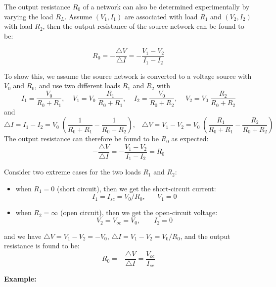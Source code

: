 \begin{itemize}

The output resistance $R_0$ of a network can also be determined 
experimentally by varying the load $R_L$. Assume $(V_1, I_1)$ are 
associated with load $R_1$ and $(V_2, I_2)$ with load $R_2$, then 
the output resistance of the source network can be found to be:

\[ R_0=-\frac{\triangle V}{\triangle I}=-\frac{V_1-V_2}{I_1-I_2} \]

To show this, we assume the source network is converted to a voltage
source with $V_0$ and $R_0$, and use two different loads $R_1$ and
$R_2$ with
\[ I_1=\frac{V_0}{R_0+R_1},\;\;\;\;V_1=V_0\;\frac{R_1}{R_0+R_1},\;\;\;\;
   I_2=\frac{V_0}{R_0+R_2},\;\;\;\;V_2=V_0\;\frac{R_2}{R_0+R_2} \]
and
\[ \triangle I=I_1-I_2=V_0\;(\frac{1}{R_0+R_1}-\frac{1}{R_0+R_2}),\;\;\;
   \triangle V=V_1-V_2=V_0\;(\frac{R_1}{R_0+R_1}-\frac{R_2}{R_0+R_2}) \]
The output resistance can therefore be found to be $R_0$ as expected:
\[ -\frac{\triangle V}{\triangle I}=-\frac{V_1-V_2}{I_1-I_2}=R_0 \]

Consider two extreme cases for the two loads $R_1$ and $R_2$:
\begin{itemize}
\item when $R_1=0$ (short circuit), then we get the short-circuit 
  current: 
  \[ I_1=I_{sc}=V_0/R_0,\;\;\;\;\;\; V_1=0 \]
\item when $R_2=\infty$ (open circuit), then we get the open-circuit
  voltage: 
  \[ V_2=V_{oc}=V_0,\;\;\;\;\;\;\;I_2=0 \]
\end{itemize}
and we have $\triangle V=V_1-V_2=-V_0$, $\triangle I=V_1-V_2=V_0/R_0$,
and the output resistance is found to be:
\[ R_0=-\frac{\triangle V}{\triangle I}=\frac{V_{oc}}{I_{sc}} \]

{\bf Example:}



\end{itemize}
